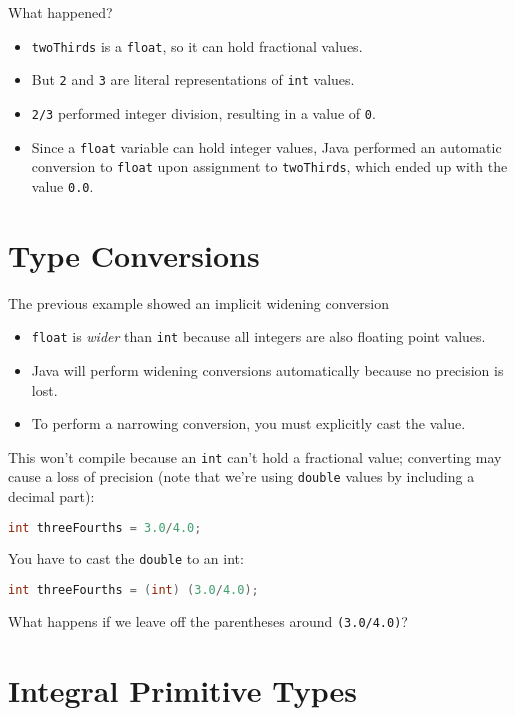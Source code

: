 \documentclass{article}
\begin{document}
What happened?

\begin{itemize}
\item {\tt twoThirds} is a {\tt float}, so it can hold fractional values.
\item But {\tt 2} and {\tt 3} are literal representations of {\tt int} values.
\item {\tt 2/3} performed integer division, resulting in a value of {\tt 0}.
\item Since a {\tt float} variable can hold integer values, Java performed an automatic conversion to {\tt float} upon assignment to {\tt twoThirds}, which ended up with the value {\tt 0.0}.
\end{itemize}




\section{Type Conversions}


The previous example showed an implicit widening conversion
\begin{itemize}
\item {\tt float} is {\it wider} than {\tt int} because all integers are also floating point values.
\item Java will perform widening conversions automatically because no precision is lost.
\item To perform a narrowing conversion, you must explicitly cast the value.
\end{itemize}

This won't compile because an {\tt int} can't hold a fractional value; converting may cause a loss of precision (note that we're using {\tt double} values by including a decimal part):
\begin{lstlisting}[language=Java]
int threeFourths = 3.0/4.0;
\end{lstlisting}

You have to cast the {\tt double} to an int:

\begin{lstlisting}[language=Java]
int threeFourths = (int) (3.0/4.0);
\end{lstlisting}

What happens if we leave off the parentheses around {\tt (3.0/4.0)}?





\section{Integral Primitive Types}
\end{document}

